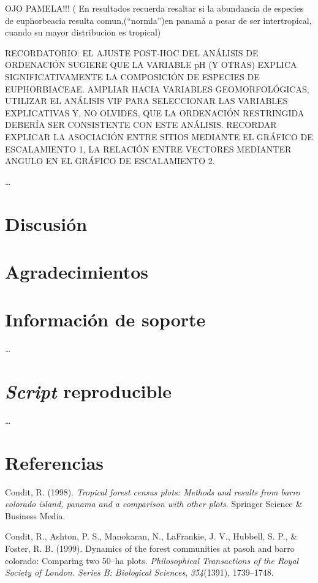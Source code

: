 \documentclass[11pt,]{article}
\begin{document}
OJO PAMELA!!! ( En resultados recuerda resaltar si la abundancia de
especies de euphorbeacia resulta comun,(``normla'')en panamá a pesar de
ser intertropical, cuando su mayor distribucion es tropical)

RECORDATORIO: EL AJUSTE POST-HOC DEL ANÁLISIS DE ORDENACIÓN SUGIERE QUE
LA VARIABLE pH (Y OTRAS) EXPLICA SIGNIFICATIVAMENTE LA COMPOSICIÓN DE
ESPECIES DE EUPHORBIACEAE. AMPLIAR HACIA VARIABLES GEOMORFOLÓGICAS,
UTILIZAR EL ANÁLISIS VIF PARA SELECCIONAR LAS VARIABLES EXPLICATIVAS Y,
NO OLVIDES, QUE LA ORDENACIÓN RESTRINGIDA DEBERÍA SER CONSISTENTE CON
ESTE ANÁLISIS. RECORDAR EXPLICAR LA ASOCIACIÓN ENTRE SITIOS MEDIANTE EL
GRÁFICO DE ESCALAMIENTO 1, LA RELACIÓN ENTRE VECTORES MEDIANTER ANGULO
EN EL GRÁFICO DE ESCALAMIENTO 2.

\ldots

\section{Discusión}\label{discusiuxf3n}

\section{Agradecimientos}\label{agradecimientos}

\section{Información de soporte}\label{informaciuxf3n-de-soporte}

\ldots

\section{\texorpdfstring{\emph{Script}
reproducible}{Script reproducible}}\label{script-reproducible}

\ldots

\section*{Referencias}\label{referencias}

\hypertarget{refs}{}
\hypertarget{ref-condit1998tropical}{}
Condit, R. (1998). \emph{Tropical forest census plots: Methods and
results from barro colorado island, panama and a comparison with other
plots}. Springer Science \& Business Media.

\hypertarget{ref-condit1999dynamics}{}
Condit, R., Ashton, P. S., Manokaran, N., LaFrankie, J. V., Hubbell, S.
P., \& Foster, R. B. (1999). Dynamics of the forest communities at pasoh
and barro colorado: Comparing two 50--ha plots. \emph{Philosophical
Transactions of the Royal Society of London. Series B: Biological
Sciences}, \emph{354}(1391), 1739--1748.
\end{document}
